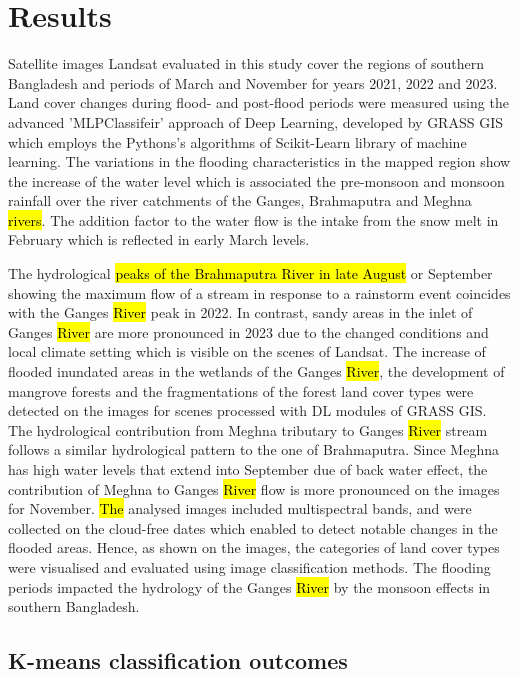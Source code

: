 \documentclass[water,article,submit,pdftex,moreauthors]{Definitions/mdpi}
\begin{document}
\section{Results}

Satellite images Landsat evaluated in this study cover the regions of southern Bangladesh and periods of March and November for years 2021, 2022 and 2023. Land cover changes during flood- and post-flood periods were measured using the advanced 'MLPClassifeir' approach of Deep Learning, developed by GRASS GIS which employs the Pythons's algorithms of Scikit-Learn library of machine learning. The variations in the flooding characteristics in the mapped region show the increase of the water level which is associated the pre-monsoon and monsoon rainfall over the river catchments of the Ganges, Brahmaputra and Meghna \hl{rivers}. The addition factor to the water flow is the intake from the snow melt in February which is reflected in early March levels. 

The hydrological \hl{peaks of the Brahmaputra River in late August} or September showing the maximum flow of a stream in response to a rainstorm event coincides with the Ganges \hl{River} peak in 2022. In contrast, sandy areas in the inlet of Ganges \hl{River} are more pronounced in 2023 due to the changed conditions and local climate setting which is visible on the scenes of Landsat. The increase of flooded inundated areas in the wetlands of the Ganges \hl{River}, the development of mangrove forests and the fragmentations of the forest land cover types were detected on the images for scenes processed with DL modules of GRASS GIS. The hydrological contribution from Meghna tributary to Ganges \hl{River} stream follows a similar hydrological pattern to the one of Brahmaputra. Since Meghna has high water levels that extend into September due of back water effect, the contribution of Meghna to Ganges \hl{River} flow is more pronounced on the images for November. \hl{The }analysed images included multispectral bands, and were collected on the cloud-free dates which enabled to detect notable changes in the flooded areas. Hence, as shown on the images, the categories of land cover types were visualised and evaluated using image classification methods. The flooding periods impacted the hydrology of the Ganges \hl{River} by the monsoon effects in southern Bangladesh.

\subsection{K-means classification outcomes}
\end{document}
